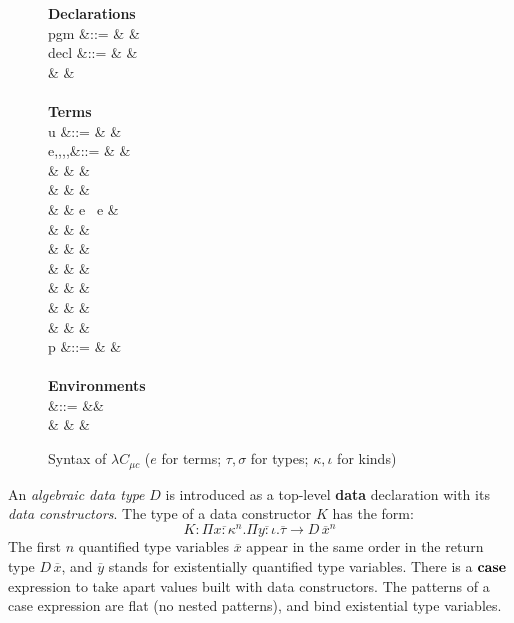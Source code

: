\begin{figure*}[ht]
  \small
  \begin{syntax}
    \textbf{Declarations} \\
    pgm &::= &  &  \\
    decl &::= &  &  \\
    & & \quad {} \\ \\
    \textbf{Terms} \\
    u &::= &  &  \\
    e,\tau,\sigma,\kappa,\iota &::= &  &  \\
    & \mid & \star &  \\
    & \mid & \square &  \\
    & \mid & e \ e &  \\
    & \mid &  &  \\
    & \mid &  &  \\
    & \mid &  &  \\
    & \mid &  &  \\
    & \mid &  &  \\
    & \mid &  &  \\
    p &::= &  &  \\ \\
    \textbf{Environments} \\
    \Gamma &::= &\varnothing &  \\
    & \mid &  & 
  \end{syntax}
  \caption{Syntax of $\lambda C_{\mu c}$ ($e$ for terms; $\tau,\sigma$
    for types; $\kappa, \iota$ for kinds)}\label{fig:datasyn}
\end{figure*}

An \emph{algebraic data type} $D$ is introduced as a top-level
\textbf{data} declaration with its \emph{data constructors}. The type
of a data constructor $K$ has the form:
\[
  K : \Pi\overline{x : \kappa}^{n}.\Pi\overline{y :
    \iota}.\overline{\tau} \rightarrow D\,\overline{x}^{n}
\]
The first $n$ quantified type variables $\overline{x}$ appear in the
same order in the return type $D\,\overline{x}$, and $\overline{y}$
stands for existentially quantified type variables. There is a $\mathbf{case}$
expression to take apart values built with data constructors. The
patterns of a case expression are flat (no nested patterns), and bind
existential type variables.

